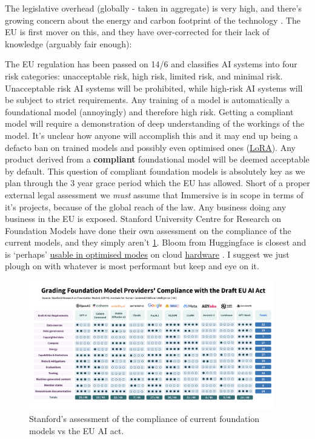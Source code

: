 The legislative overhead (globally - taken in aggregate) is very high, and there's growing concern about the energy and carbon footprint of the technology \cite{wu2022sustainable}. The EU is first mover on this, and they have over-corrected for their lack of knowledge (arguably fair enough):\par
The EU regulation has been passed on 14/6 and classifies AI systems into four risk categories: unacceptable risk, high risk, limited risk, and minimal risk. Unacceptable risk AI systems will be prohibited, while high-risk AI systems will be subject to strict requirements. Any training of a model is automatically a foundational model (annoyingly) and therefore high risk. Getting a compliant model will require a demonstration of deep understanding of the workings of the model. It's unclear how anyone will accomplish this and it may end up being a defacto ban on trained models and possibly even optimised ones (\hyperref[sec:LoRA]{LoRA}). Any product derived from a \textbf{compliant} foundational model will be deemed acceptable by default. This question of compliant foundation models is absolutely key as we plan through the 3 year grace period which the EU has allowed. Short of a proper external legal assessment we \textit{must} assume that Immersive is in scope in terms of it's projects, because of the global reach of the law. Any business doing any business in the EU is exposed. Stanford University Centre for Research on Foundation Models have done their own assessment on the compliance of the current models, and they simply aren't \ref{fig:euAIcompliance}. Bloom from Huggingface is closest and is `perhaps' \href{https://huggingface.co/BelleGroup/BELLE_BLOOM_GPTQ_4BIT}{usable in optimised modes} on cloud \href{https://lambdalabs.com/nvidia-h100-gpus}{hardware} \cite{dettmers2022case}. I suggest we just plough on with whatever is most performant but keep and eye on it.

\begin{figure}[H]
    \centering
    \includegraphics[width=0.95\textwidth]{images/euaicompliance}
    \caption{Stanford's assessment of the compliance of current foundation models vs the EU AI act.}
    \label{fig:euAIcompliance}
\end{figure}

